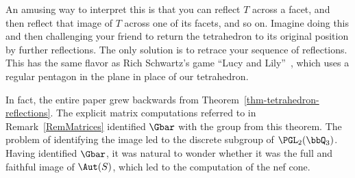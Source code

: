 An amusing way to interpret this is that you can reflect $T$ across a facet, and then reflect that image of $T$ across one of its facets, and so on. Imagine doing this and then challenging your friend to return the tetrahedron to its original position by further reflections. The only solution is to retrace your sequence of reflections. This has the same flavor as Rich Schwartz's game ``Lucy and Lily''~\cite{Schwartz}, which uses a regular pentagon in the plane in place of our tetrahedron.

In fact, the entire paper grew backwards from Theorem~\ref{thm-tetrahedron-reflections}. The explicit matrix computations referred to in Remark~\ref{RemMatrices} identified $\Gbar$ with the group from this theorem. The problem of identifying the image led to the discrete subgroup of $\PGL_2(\bbQ_3)$. Having identified $\Gbar$, it was natural to wonder whether it was the full and faithful image of $\Aut(S)$, which led to the computation of the nef cone.

\pagebreak
